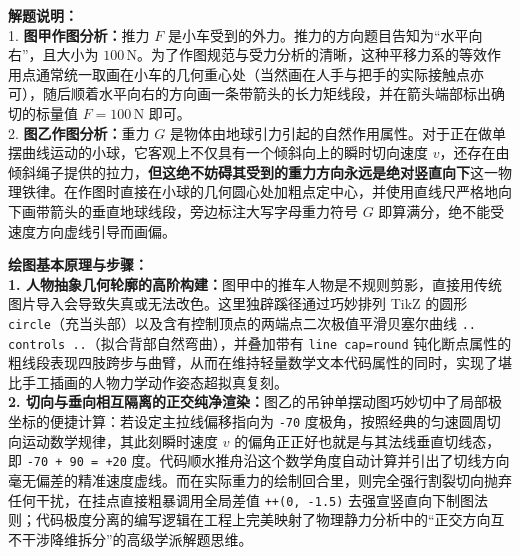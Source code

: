\begin{center}
\end{center}

\vspace{0.6cm}

{\small\color{gray}
\textbf{解题说明：}\\
1. \textbf{图甲作图分析：}推力 $F$ 是小车受到的外力。推力的方向题目告知为“水平向右”，且大小为 $100\,\text{N}$。为了作图规范与受力分析的清晰，这种平移力系的等效作用点通常统一取画在小车的几何重心处（当然画在人手与把手的实际接触点亦可），随后顺着水平向右的方向画一条带箭头的长力矩线段，并在箭头端部标出确切的标量值 $F = 100\,\text{N}$ 即可。\\
2. \textbf{图乙作图分析：}重力 $G$ 是物体由地球引力引起的自然作用属性。对于正在做单摆曲线运动的小球，它客观上不仅具有一个倾斜向上的瞬时切向速度 $v$，还存在由倾斜绳子提供的拉力，\textbf{但这绝不妨碍其受到的重力方向永远是绝对竖直向下}这一物理铁律。在作图时直接在小球的几何圆心处加粗点定中心，并使用直线尺严格地向下画带箭头的垂直地球线段，旁边标注大写字母重力符号 $G$ 即算满分，绝不能受速度方向虚线引导而画偏。
}

\vspace{0.6cm}

{\small\color{blue!70!black}
\textbf{绘图基本原理与步骤：}\\
\textbf{1. 人物抽象几何轮廓的高阶构建：}图甲中的推车人物是不规则剪影，直接用传统图片导入会导致失真或无法改色。这里独辟蹊径通过巧妙排列 TikZ 的圆形 \texttt{circle}（充当头部）以及含有控制顶点的两端点二次极值平滑贝塞尔曲线 \texttt{.. controls ..}（拟合背部自然弯曲），并叠加带有 \texttt{line cap=round} 钝化断点属性的粗线段表现四肢跨步与曲臂，从而在维持轻量数学文本代码属性的同时，实现了堪比手工插画的人物力学动作姿态超拟真复刻。\\
\textbf{2. 切向与垂向相互隔离的正交纯净渲染：}图乙的吊钟单摆动图巧妙切中了局部极坐标的便捷计算：若设定主拉线偏移指向为 \texttt{-70} 度极角，按照经典的匀速圆周切向运动数学规律，其此刻瞬时速度 $v$ 的偏角正正好也就是与其法线垂直切线态，即 \texttt{-70 + 90 = +20} 度。代码顺水推舟沿这个数学角度自动计算并引出了切线方向毫无偏差的精准速度虚线。而在实际重力的绘制回合里，则完全强行割裂切向抛弃任何干扰，在挂点直接粗暴调用全局差值 \texttt{++(0, -1.5)} 去强宣竖直向下制图法则；代码极度分离的编写逻辑在工程上完美映射了物理静力分析中的“正交方向互不干涉降维拆分”的高级学派解题思维。
}


